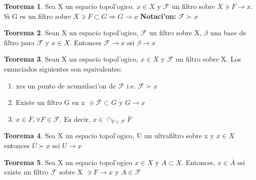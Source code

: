 \documentclass{article}
\theoremstyle{definition}
\newtheorem{theorem}{Teorema}
\begin{document}
\begin{theorem}
	Sea X un espacio topol'ogico. $x\in X$ y $\mathcal{F}$ un filtro sobre $X\ni F\to x$. Si G es un filtro sobre $X\ni F\subset G\Rightarrow G\to x$
	\textbf{Notaci'on: } $\mathcal{F} \succ x$
\end{theorem}
\begin{theorem}
	Sean X un espacio topol'ogico, $\mathcal{F}$ un filtro sobre X, $\beta$ una base de filtro para $\mathcal{F}$ y $x\in X$. Entonces $\mathcal{F}\to x$ ssi $\beta \to x$
\end{theorem}
\begin{theorem}
	Sean X un espacio topol'ogico, $x\in X$ y $\mathcal{F}$ un filtro sobre X. Los enunciados siguientes son equivalentes:
	\begin{enumerate}
		\item xes un punto de acumulaci'on de $\mathcal{F}$ i.e. $\mathcal{F} \succ x$
		\item Existe un filtro G en x $\ni\mathcal{F}\subset G$ y $G\to x$
		\item $x\in \overline{F}, \forall F \in \mathcal{F}$. Es decir, $x\in \cap_{F\in\mathcal{F}}\overline{F}$ 
	\end{enumerate}
\end{theorem}
\begin{theorem}
	Sea X un espacio topol'ogico, U un ultrafiltro sobre x y $x\in X$ entonces $U \succ x$ ssi $U\to x$
\end{theorem}
\begin{theorem}
	Sea X un espacio topol'ogico $x\in X$ y $A\subset X$. Entonces, $x\in\overline{A}$ ssi existe un filtro $\mathcal{F}$ sobre X $\ni F\to x$ y $A\in\mathcal{F}$
\end{theorem}




\end{document}
